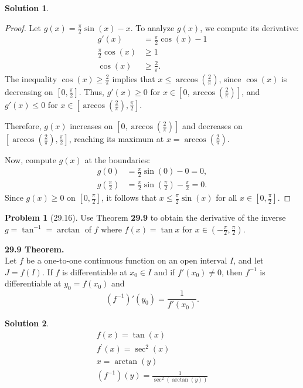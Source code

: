 \documentclass[12pt]{article}
\theoremstyle{definition} %
\newtheorem{solution}{Solution}
\newtheorem{problem}{Problem}
\theoremstyle{plain} %
\begin{document}
\begin{solution}
\begin{enumerate}
    \begin{proof}
        Let $g(x) = \frac{\pi}{2}\sin(x) - x$. To analyze $g(x)$, we compute its derivative:
        \begin{align}
            g'(x) &= \frac{\pi}{2}\cos(x) - 1 \\[10pt] 
            \frac{\pi}{2}\cos(x) &\geq 1 \\[10pt] 
            \cos(x) &\geq \frac{2}{\pi}.
        \end{align}
        The inequality $\cos(x) \geq \frac{2}{\pi}$ implies that $x \leq \arccos\left(\frac{2}{\pi}\right)$, since $\cos(x)$ is decreasing on $[0, \frac{\pi}{2}]$. Thus, $g'(x) \geq 0$ for $x \in [0, \arccos\left(\frac{2}{\pi}\right)]$, and $g'(x) \leq 0$ for $x \in [\arccos\left(\frac{2}{\pi}\right), \frac{\pi}{2}]$. 
    
        Therefore, $g(x)$ increases on $[0, \arccos\left(\frac{2}{\pi}\right)]$ and decreases on $[\arccos\left(\frac{2}{\pi}\right), \frac{\pi}{2}]$, reaching its maximum at $x = \arccos\left(\frac{2}{\pi}\right)$.
    
        Now, compute $g(x)$ at the boundaries:
        \begin{align}
            g(0) &= \frac{\pi}{2}\sin(0) - 0 = 0, \\[10pt]
            g\left(\frac{\pi}{2}\right) &= \frac{\pi}{2}\sin\left(\frac{\pi}{2}\right) - \frac{\pi}{2} = 0.
        \end{align}
        Since $g(x) \geq 0$ on $[0, \frac{\pi}{2}]$, it follows that $x \leq \frac{\pi}{2}\sin(x)$ for all $x \in [0, \frac{\pi}{2}]$.
    \end{proof}
\end{enumerate}
\end{solution}
\begin{problem}[29.16]
    Use Theorem \textbf{29.9} to obtain the derivative of the inverse $ g = \tan^{-1} = \arctan $ of $ f $ where $ f(x) = \tan x $ for $ x \in \left( -\frac{\pi}{2}, \frac{\pi}{2} \right) $.

\bigskip

\textbf{29.9 Theorem.} \\
Let $ f $ be a one-to-one continuous function on an open interval $ I $, and let $ J = f(I) $. If $ f $ is differentiable at $ x_0 \in I $ and if $ f'(x_0) \neq 0 $, then $ f^{-1} $ is differentiable at $ y_0 = f(x_0) $ and
$$
(f^{-1})'(y_0) = \frac{1}{f'(x_0)}.
$$
\end{problem}
\begin{solution}
    \begin{align}
        f(x)=\tan(x) \\[10pt] 
        f^\prime (x)=\sec^{2}(x) \\[10pt] 
        x=\arctan(y) \\[10pt] 
        \left( f^{-1} \right) \left( y \right) =\frac{1}{\sec^{2}\left( \arctan(y) \right) }
    \end{align}
\end{solution}
\end{document}
